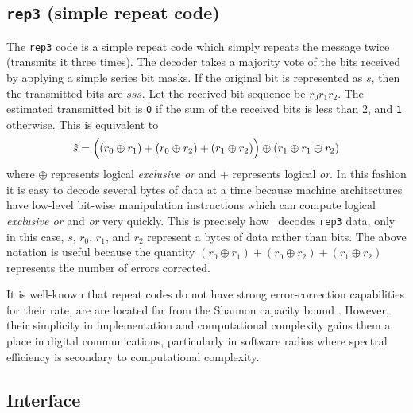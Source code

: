 \subsection{{\tt rep3} (simple repeat code)}
\label{module:fec:rep3}
The {\tt rep3} code is a simple repeat code which simply repeats the message
twice (transmits it three times).
The decoder takes a majority vote of the bits received by applying a simple
series bit masks.
If the original bit is represented as $s$, then the transmitted bits are
$s s s$.
Let the received bit sequence be $r_0 r_1 r_2$.
The estimated transmitted bit is {\tt 0} if the sum of the received bits is
less than 2, and {\tt 1} otherwise.
This is equivalent to
\[
    \hat{s} =   \Bigl(
                (r_0 \oplus r_1) + 
                (r_0 \oplus r_2) + 
                (r_1 \oplus r_2) 
                \Bigr)
                \oplus
                (r_1 \oplus r_1 \oplus r_2)
\]
where $\oplus$ represents logical {\it exclusive or} and $+$ represents
logical {\it or}.
In this fashion it is easy to decode several bytes of data at a time because
machine architectures have low-level bit-wise manipulation instructions which
can compute logical {\it exclusive or} and {\it or} very quickly.
This is precisely how \liquid\ decodes {\tt rep3} data, only in this case,
$s$, $r_0$, $r_1$, and $r_2$ represent a bytes of data rather than bits.
The above notation is useful because the quantity
$(r_0 \oplus r_1) + (r_0 \oplus r_2) + (r_1 \oplus r_2)$
represents the number of errors corrected.

It is well-known that repeat codes do not have strong error-correction
capabilities for their rate, are are located far from the Shannon capacity
bound \cite{Proakis:2001}.
However, their simplicity in implementation and computational complexity gains
them a place in digital communications, particularly in software radios where
spectral efficiency is secondary to computational complexity.

\subsection{Interface}
\label{module:fec:interface}

